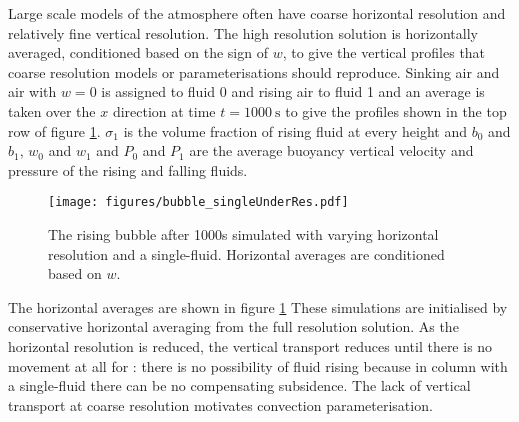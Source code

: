 \documentclass[draft]{agujournal2019}
\begin{document}
{Large scale models of the atmosphere often have coarse horizontal resolution and relatively fine vertical resolution. The high resolution solution is horizontally averaged, conditioned based on the sign of $w$, to give the vertical profiles that coarse resolution models or parameterisations should reproduce. Sinking air and air with $w=0$ is assigned to fluid 0 and rising air to fluid 1 and an average is taken over the $x$ direction at time $t=1000\ \text{s}$ to give the profiles}
shown in the top row of figure \ref{fig:bubble_singleUnderRes}.
$\sigma_{1}$ is the volume fraction of rising fluid at every height and $b_{0}$ and $b_{1}$, $w_{0}$ and $w_{1}$ and $P_{0}$ and $P_{1}$
are the average buoyancy vertical velocity and pressure of the rising and falling fluids. 

\begin{figure}
\noindent \begin{centering}
\texttt{[image: figures/bubble\_singleUnderRes.pdf]}
\par\end{centering}
\caption{The rising bubble after 1000s simulated with varying horizontal resolution
and a single-fluid. Horizontal averages are conditioned based on $w$.
\label{fig:bubble_singleUnderRes}}
\end{figure}

The  horizontal averages  are shown in figure \ref{fig:bubble_singleUnderRes}
These simulations are initialised by conservative
horizontal averaging from the full resolution solution. As the horizontal
resolution is reduced, the vertical transport reduces until there
is no movement at all for : there is no possibility
of fluid rising because in  column with a single-fluid there can be no compensating subsidence. The lack of vertical transport
at coarse resolution motivates convection parameterisation. 
\end{document}
